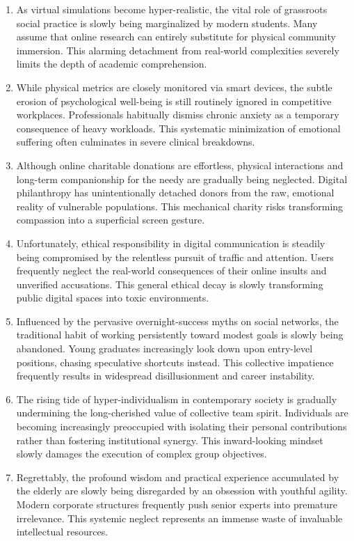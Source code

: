 ﻿\documentclass[lang=cn,11pt]{elegantbook}
\begin{document}
\begin{enumerate}
\item As virtual simulations become hyper-realistic, the vital role of grassroots social practice is slowly being marginalized by modern students. Many assume that online research can entirely substitute for physical community immersion. This alarming detachment from real-world complexities severely limits the depth of academic comprehension.
\item While physical metrics are closely monitored via smart devices, the subtle erosion of psychological well-being is still routinely ignored in competitive workplaces. Professionals habitually dismiss chronic anxiety as a temporary consequence of heavy workloads. This systematic minimization of emotional suffering often culminates in severe clinical breakdowns. 
\item Although online charitable donations are effortless, physical interactions and long-term companionship for the needy are gradually being neglected. Digital philanthropy has unintentionally detached donors from the raw, emotional reality of vulnerable populations. This mechanical charity risks transforming compassion into a superficial screen gesture.
\item Unfortunately, ethical responsibility in digital communication is steadily being compromised by the relentless pursuit of traffic and attention. Users frequently neglect the real-world consequences of their online insults and unverified accusations. This general ethical decay is slowly transforming public digital spaces into toxic environments.
\item Influenced by the pervasive overnight-success myths on social networks, the traditional habit of working persistently toward modest goals is slowly being abandoned. Young graduates increasingly look down upon entry-level positions, chasing speculative shortcuts instead. This collective impatience frequently results in widespread disillusionment and career instability.
\item The rising tide of hyper-individualism in contemporary society is gradually undermining the long-cherished value of collective team spirit. Individuals are becoming increasingly preoccupied with isolating their personal contributions rather than fostering institutional synergy. This inward-looking mindset slowly damages the execution of complex group objectives.
\item Regrettably, the profound wisdom and practical experience accumulated by the elderly are slowly being disregarded by an obsession with youthful agility. Modern corporate structures frequently push senior experts into premature irrelevance. This systemic neglect represents an immense waste of invaluable intellectual resources.

\end{enumerate}
\end{document}
